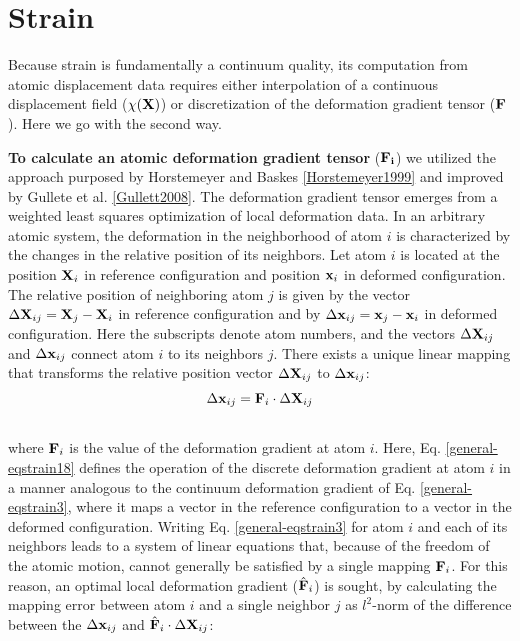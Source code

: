 \documentclass[letterpaper,10pt,english]{sphinxmanual}
\begin{document}
\section{Strain}
\label{general:numerstrain}\label{general:id7}
Because strain is fundamentally a continuum quality, its computation from atomic displacement data requires either interpolation of a continuous displacement field ($\chi({\bf X})$) or discretization of the deformation gradient tensor (${\bf F}$). Here we go with the second way.

\textbf{To calculate an atomic deformation gradient tensor} (${\bf F_i}$) we utilized the approach purposed by Horstemeyer and Baskes {\hyperref[general:horstemeyer1999]{{[}Horstemeyer1999{]}}} and improved by Gullete et al. {\hyperref[general:gullett2008]{{[}Gullett2008{]}}}. The deformation gradient tensor emerges from a weighted least squares optimization of local deformation data. In an arbitrary atomic system, the deformation in the neighborhood of atom $i$ is characterized by the changes in the relative position of its neighbors. Let atom $i$ is located at the position ${\bf X}_i$ in reference configuration and position ${\bf x}_i$ in deformed configuration. The relative position of neighboring atom $j$ is given by the vector $\Delta {\bf X}_{ij}={\bf X}_{j}-{\bf X}_{i}$ in reference configuration and by $\Delta {\bf x}_{ij}={\bf x}_{j}-{\bf x}_{i}$ in deformed configuration. Here the subscripts denote atom numbers, and the vectors $\Delta {\bf X}_{ij}$ and $\Delta {\bf x}_{ij}$ connect atom $i$ to its neighbors $j$. There exists a unique linear mapping that transforms the relative position vector $\Delta {\bf X}_{ij}$ to $\Delta {\bf x}_{ij}$:
\label{general:equation-eqstrain18}\begin{gather}
\begin{split}\Delta {\bf x}_{ij} = {\bf F}_{i} \cdot \Delta {\bf X}_{ij}\end{split}\label{general-eqstrain18}\\\begin{split}\end{split}\notag
\end{gather}
where ${\bf F}_i$ is the value of the deformation gradient at atom $i$. Here, Eq. \eqref{general-eqstrain18} defines the operation of the discrete deformation gradient at atom $i$ in a manner analogous to the continuum deformation gradient of Eq. \eqref{general-eqstrain3},  where it maps a vector in the reference configuration to a vector in the deformed configuration. Writing Eq. \eqref{general-eqstrain3} for atom $i$ and each of its neighbors leads to a system of linear equations that, because of the freedom of the atomic motion, cannot generally be satisfied by a single mapping ${\bf F}_i$. For this reason, an optimal local deformation gradient ($\hat {\bf F}_i$) is sought, by calculating the mapping error between atom $i$ and a single neighbor $j$ as $l^2$-norm of the difference between the $\Delta {\bf x}_{ij}$ and $\hat {\bf F}_{i} \cdot \Delta {\bf X}_{ij}$:
\end{document}
